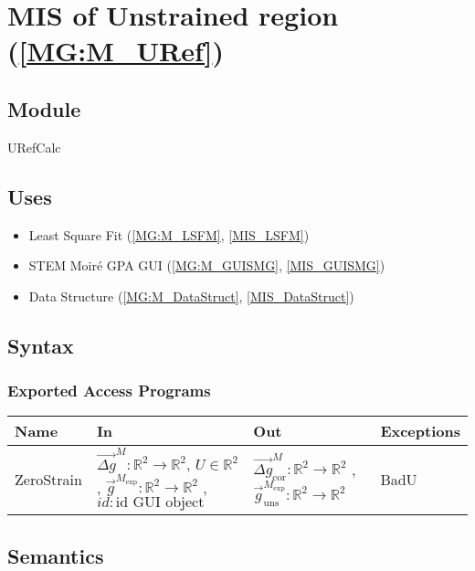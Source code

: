 \documentclass[12pt, titlepage]{article}
\begin{document}
\section{MIS of Unstrained region (\texorpdfstring{\cref{MG:M_URef}}))} \label{MIS_URef}

\subsection{Module}
URefCalc
\subsection{Uses}
\begin{itemize}
\item Least Square Fit (\cref{MG:M_LSFM}, \cref{MIS_LSFM})
\item STEM Moir{\'e} GPA GUI (\cref{MG:M_GUISMG}, \cref{MIS_GUISMG})
\item Data Structure (\cref{MG:M_DataStruct}, \cref{MIS_DataStruct})
\end{itemize}

\subsection{Syntax}

\subsubsection{Exported Access Programs}

\begin{center}
\begin{tabular}{p{2cm} p{4cm} p{4cm} p{2cm}}
\hline
\textbf{Name} & \textbf{In} & \textbf{Out} & \textbf{Exceptions} \\
\hline
ZeroStrain & $\overrightarrow{\Delta g}^M:\mathbb{R}^2\rightarrow\mathbb{R}^2$, $U \in \mathbb{R}^2$ , $\overrightarrow{g}^{M_{\text{exp}}}:\mathbb{R}^2\rightarrow\mathbb{R}^2$ , $id : \text{id GUI object}$  & $\overrightarrow{\Delta g}_{\text{cor}}^M:\mathbb{R}^2\rightarrow\mathbb{R}^2$ , $\overrightarrow{g}_{\text{uns}}^{M_{\text{exp}}}:\mathbb{R}^2\rightarrow\mathbb{R}^2$ & BadU \\
\hline
\end{tabular}
\end{center}

\subsection{Semantics}
\end{document}
